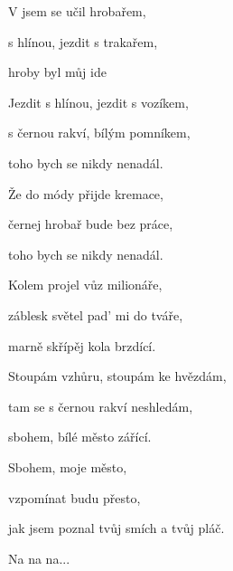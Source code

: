 

\zs
V  jsem se učil hrobařem,

 s hlínou, jezdit s trakařem,

 hroby byl můj ide
\ks

\zs
Jezdit s hlínou, jezdit s vozíkem,

s černou rakví, bílým pomníkem,

toho bych se nikdy nenadál.
\ks

\zs
Že do módy přijde kremace,

černej hrobař bude bez práce,

toho bych se nikdy nenadál.
\ks

\zs
Kolem projel vůz milionáře,

záblesk světel pad' mi do tváře,

marně skřípěj kola brzdící.
\ks

\zs
Stoupám vzhůru, stoupám ke hvězdám,

tam se s černou rakví neshledám,

sbohem, bílé město zářící.
\ks

\zr
Sbohem, moje město,

vzpomínat budu přesto,

jak jsem poznal tvůj smích a tvůj pláč.
\kr

\zs
Na na na...
\ks

\kp

